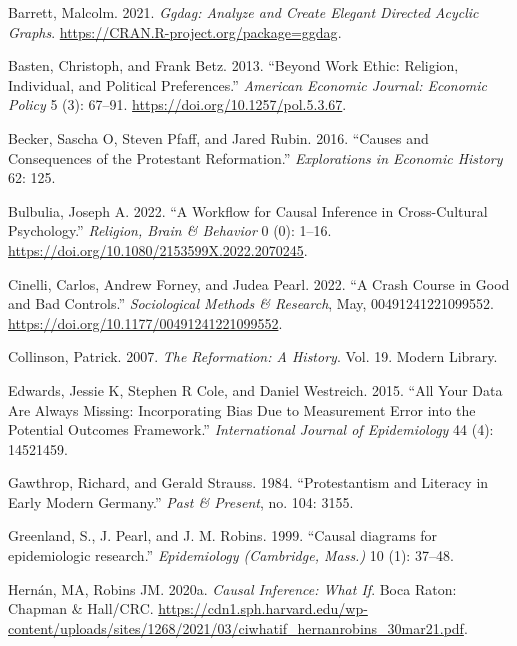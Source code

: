 \documentclass[
  singlecolumn]{report}
\newlength{\cslhangindent}
\newlength{\cslentryspacingunit} %
\newenvironment{CSLReferences}[2] %
 {%
  \setlength{\parindent}{0pt}
  \ifodd #1
  \let\oldpar\par
  \def\par{\hangindent=\cslhangindent\oldpar}
  \fi
  \setlength{\parskip}{#2\cslentryspacingunit}
 }%
 {}
\begin{document}
\hypertarget{refs}{}
\begin{CSLReferences}{1}{0}
\leavevmode{}%
Barrett, Malcolm. 2021. \emph{Ggdag: Analyze and Create Elegant Directed
Acyclic Graphs}. \url{https://CRAN.R-project.org/package=ggdag}.

\leavevmode{}%
Basten, Christoph, and Frank Betz. 2013. {``Beyond Work Ethic: Religion,
Individual, and Political Preferences.''} \emph{American Economic
Journal: Economic Policy} 5 (3): 67--91.
\url{https://doi.org/10.1257/pol.5.3.67}.

\leavevmode{}%
Becker, Sascha O, Steven Pfaff, and Jared Rubin. 2016. {``Causes and
Consequences of the Protestant Reformation.''} \emph{Explorations in
Economic History} 62: 125.

\leavevmode{}%
Bulbulia, Joseph A. 2022. {``A Workflow for Causal Inference in
Cross-Cultural Psychology.''} \emph{Religion, Brain \& Behavior} 0 (0):
1--16. \url{https://doi.org/10.1080/2153599X.2022.2070245}.

\leavevmode{}%
Cinelli, Carlos, Andrew Forney, and Judea Pearl. 2022. {``A Crash Course
in Good and Bad Controls.''} \emph{Sociological Methods \& Research},
May, 00491241221099552. \url{https://doi.org/10.1177/00491241221099552}.

\leavevmode{}%
Collinson, Patrick. 2007. \emph{The Reformation: A History}. Vol. 19.
Modern Library.

\leavevmode{}%
Edwards, Jessie K, Stephen R Cole, and Daniel Westreich. 2015. {``All
Your Data Are Always Missing: Incorporating Bias Due to Measurement
Error into the Potential Outcomes Framework.''} \emph{International
Journal of Epidemiology} 44 (4): 14521459.

\leavevmode{}%
Gawthrop, Richard, and Gerald Strauss. 1984. {``Protestantism and
Literacy in Early Modern Germany.''} \emph{Past \& Present}, no. 104:
3155.

\leavevmode{}%
Greenland, S., J. Pearl, and J. M. Robins. 1999. {``Causal diagrams for
epidemiologic research.''} \emph{Epidemiology (Cambridge, Mass.)} 10
(1): 37--48.

\leavevmode{}%
Hernán, MA, Robins JM. 2020a. \emph{Causal Inference: What If}. Boca
Raton: Chapman \& Hall/CRC.
\url{https://cdn1.sph.harvard.edu/wp-content/uploads/sites/1268/2021/03/ciwhatif_hernanrobins_30mar21.pdf}.


\end{CSLReferences}
\end{document}
